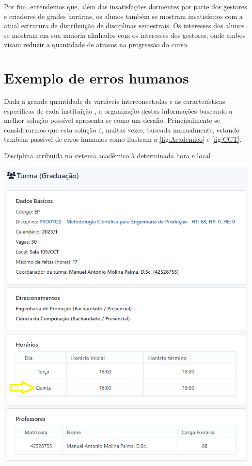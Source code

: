 Por fim, entendemos que, além das insatisfações dormentes por parte dos gestores e criadores de grades horárias, os alunos também se mostram insatisfeitos com a atual estrutura de distribuição de disciplinas semestrais. Os interesses dos alunos se mostram em sua maioria alinhados com os interesses dos gestores, onde ambos visam reduzir a quantidade de atrasos na progressão do curso.

\section{Exemplo de erros humanos} %

Dada a grande quantidade de variáveis interconectadas e as características específicas de cada instituição \cite{miranda_udpskeduler_2012}, a organização destas informações buscando a melhor solução possível apresenta-se como um desafio. Principalmente se considerarmos que esta solução é, muitas vezes, buscada manualmente, estando também passível de erros humanos como ilustram a \autoref{fig:Academico} e \autoref{fig:CCT}.

\begin{MyCenteredFigure}
  \caption{Disciplina atribuída no sistema acadêmico à determinada hora e local}
  \label{fig:Academico}
  \includegraphics[width=\textwidth]{files/img/FalhaDeAlocacao/Metodologia-Quinta}
\end{MyCenteredFigure}    %

